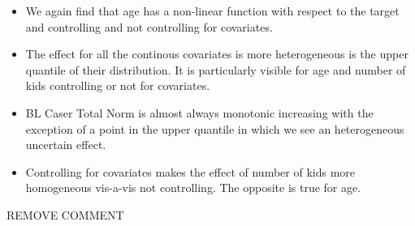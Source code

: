\documentclass{article}
\newenvironment{colorparagraph}[1]{\par\color{#1}}{\par}
\begin{document}
\begin{itemize}
  \item We again find that age has a non-linear function with respect to the target and controlling and not controlling for covariates.
  \item The effect for all the continous covariates is more heterogeneous is the upper quantile of their distribution. It is particularly visible for age and number of kids controlling or not for covariates.
  \item BL Caser Total Norm is almost always monotonic increasing with the exception of a point in the upper quantile in which we see an heterogeneous uncertain effect.
  \item Controlling for covariates makes the effect of number of kids more homogeneous vis-a-vis not controlling. The opposite is true for age.
\end{itemize}

\begin{colorparagraph}{tacolor}
  REMOVE COMMENT
\end{colorparagraph}
\end{document}
